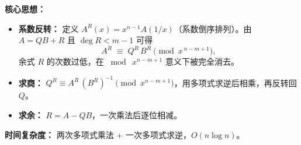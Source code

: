 \textbf{核心思想：}
\begin{itemize}
    \item \textbf{系数反转：} 定义 $A^{R}(x)=x^{n-1}A(1/x)$（系数倒序排列）。由 $A=QB+R$ 且 $\deg R < m-1$ 可得
    \[ A^{R} \;\equiv\; Q^{R}\,B^{R} \pmod{x^{\,n-m+1}}, \]
    余式 $R$ 的次数过低，在 $\bmod\ x^{n-m+1}$ 意义下被完全消去。
    \item \textbf{求商：} $Q^{R} \equiv A^{R}\,(B^{R})^{-1} \pmod{x^{n-m+1}}$，用多项式求逆后相乘，再反转回 $Q$。
    \item \textbf{求余：} $R = A - Q B$，一次乘法后逐位相减。
\end{itemize}

\textbf{时间复杂度：} 两次多项式乘法 + 一次多项式求逆，$O(n\log n)$。



